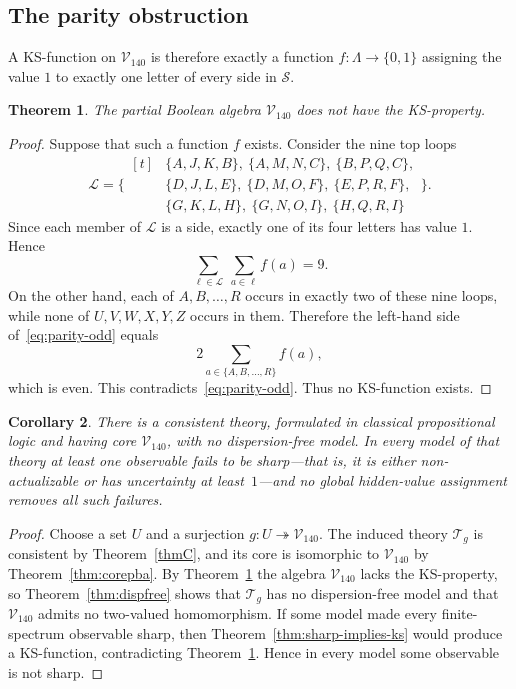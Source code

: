 \documentclass{article}   	%
\theoremstyle{plain}
\newtheorem{theorem}{Theorem}[section]
\newtheorem{corollary}[theorem]{Corollary}
\theoremstyle{definition}
\theoremstyle{remark}
\begin{document}
\subsection{The parity obstruction}

A KS-function on $\mathcal V_{140}$ is therefore exactly a function
$f:\Lambda\to\{0,1\}$ assigning the value $1$ to exactly one letter of every
side in $\mathcal S$.

\begin{theorem}
\label{thm:noKS}
The partial Boolean algebra $\mathcal V_{140}$ does not have the KS-property.
\end{theorem}

\begin{proof}
Suppose that such a function $f$ exists.  Consider the nine top loops
\[
\mathcal L=\bigl\{
\begin{aligned}[t]
&\{A,J,K,B\},\ \{A,M,N,C\},\ \{B,P,Q,C\},\\
&\{D,J,L,E\},\ \{D,M,O,F\},\ \{E,P,R,F\},\\
&\{G,K,L,H\},\ \{G,N,O,I\},\ \{H,Q,R,I\}
\end{aligned}
\bigr\}.
\]
Since each member of $\mathcal L$ is a side, exactly one of its four letters has
value $1$.  Hence
\begin{equation}
\label{eq:parity-odd}
\sum_{\ell\in\mathcal L}\ \sum_{a\in\ell}f(a)=9.
\end{equation}
On the other hand, each of $A,B,\ldots,R$ occurs in exactly two of these nine
loops, while none of $U,V,W,X,Y,Z$ occurs in them.  Therefore the left-hand side
of~\eqref{eq:parity-odd} equals
\[
2\sum_{a\in\{A,B,\ldots,R\}}f(a),
\]
which is even.  This contradicts~\eqref{eq:parity-odd}.  Thus no KS-function
exists.
\end{proof}

\begin{corollary}
\label{cor:macrouncertain}
There is a consistent theory, formulated in classical propositional logic and
having core $\mathcal V_{140}$, with no dispersion-free model.  In every model
of that theory at least one observable fails to be sharp---that is, it is either
non-actualizable or has uncertainty at least~$1$---and no global hidden-value
assignment removes all such failures.
\end{corollary}

\begin{proof}
Choose a set $U$ and a surjection $g:U\twoheadrightarrow\mathcal V_{140}$.
The induced theory $\mathcal T_g$ is consistent by Theorem~\ref{thmC}, and its
core is isomorphic to $\mathcal V_{140}$ by Theorem~\ref{thm:corepba}.
By Theorem~\ref{thm:noKS} the algebra $\mathcal V_{140}$ lacks the
KS-property, so Theorem~\ref{thm:dispfree} shows that $\mathcal T_g$ has no
dispersion-free model and that $\mathcal V_{140}$ admits no two-valued
homomorphism.  If some model made every finite-spectrum observable sharp, then
Theorem~\ref{thm:sharp-implies-ks} would produce a KS-function, contradicting
Theorem~\ref{thm:noKS}.  Hence in every model some observable is not sharp.
\end{proof}
\end{document}
